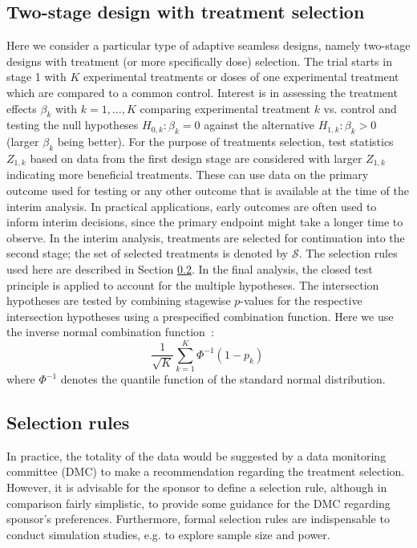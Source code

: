 \documentclass[bimj,fleqn]{w-art}
\theoremstyle{plain}
\theoremstyle{definition}
\begin{document}
\subsection{Two-stage design with treatment selection}
\label{ssec:two_stage_design_with_treatment_selection}
Here we consider a particular type of adaptive seamless designs, namely two-stage designs with treatment (or more specifically dose) selection. The trial starts in stage 1 with $K$ experimental treatments or doses of one experimental treatment which are compared to a common control. Interest is in assessing the treatment effects $\beta_k$ with $k=1,\dots, K$ comparing experimental treatment $k$ vs. control and testing the null hypotheses $H_{0,k}: \beta_k=0$ against the alternative  $H_{1,k}: \beta_k>0$ (larger $\beta_k$ being better). For the purpose of treatments selection, test statistics $Z_{1,k}$ based on data from the first design stage are considered with larger $Z_{1,k}$ indicating more beneficial treatments. These can use data on the primary outcome used for testing or any other outcome that is available at the time of the interim analysis. In practical applications, early outcomes are often used to inform interim decisions, since the primary endpoint might take a longer time to observe. In the interim analysis, treatments are selected for continuation into the second stage; the set of selected treatments is denoted by $\mathcal{S}$. The selection rules used here are described in Section \ref{ssec:selection_rules}. In the final analysis, the closed test principle is applied to account for the multiple hypotheses. The intersection hypotheses are tested by combining stagewise $p$-values for the respective intersection hypotheses using a prespecified combination function. Here we use the inverse normal combination function~\citep{lehmacher_adaptive_1999}:
\begin{equation}
  \frac{1}{\sqrt{K}} \sum_{k=1}^K \Phi^{-1}(1-p_k) \,
\end{equation}
where $\Phi^{-1}$ denotes the quantile function of the standard normal distribution.

\subsection{Selection rules}
\label{ssec:selection_rules}
In practice, the totality of the data would be suggested by a data monitoring committee (DMC) to make a recommendation regarding the treatment selection. However, it is advisable for the sponsor to define a selection rule, although in comparison fairly simplistic, to provide some guidance for the DMC regarding sponsor's preferences. Furthermore, formal selection rules are indispensable to conduct simulation studies, e.g. to explore sample size and power. 
\end{document}
